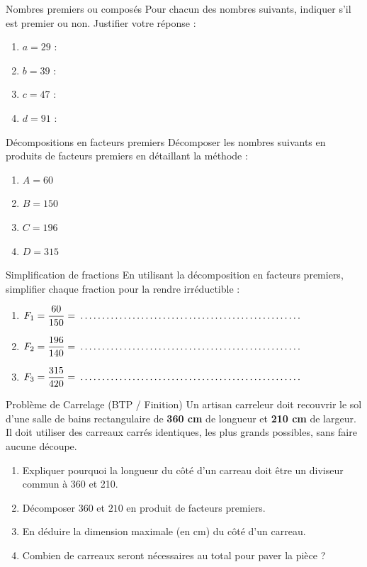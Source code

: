 \begin{exercice}[3 pts]{\capAnalyser}{Nombres premiers ou composés}
Pour chacun des nombres suivants, indiquer s'il est premier ou non. Justifier votre réponse :
\begin{enumerate}
    \item $a = 29$ : \pointille[9cm]
    \item $b = 39$ : \pointille[9cm]
    \item $c = 47$ : \pointille[9cm]
    \item $d = 91$ : \pointille[9cm]
\end{enumerate}
\end{exercice}

\begin{exercice}[3 pts]{\capRealiser}{Décompositions en facteurs premiers}
Décomposer les nombres suivants en produits de facteurs premiers en détaillant la méthode :
\begin{enumerate}
    \item $A = 60$
    \item $B = 150$
    \item $C = 196$
    \item $D = 315$
\end{enumerate}
\lignesreponse[6]
\end{exercice}

\begin{exercice}[4 pts]{\capRealiser}{Simplification de fractions}
En utilisant la décomposition en facteurs premiers, simplifier chaque fraction pour la rendre irréductible :
\begin{enumerate}
    \item $F_1 = \dfrac{60}{150} = \pointille[8cm]$
    \item $F_2 = \dfrac{196}{140} = \pointille[8cm]$
    \item $F_3 = \dfrac{315}{420} = \pointille[8cm]$
\end{enumerate}
\lignesreponse[4]
\end{exercice}

\begin{exercice}[4 pts]{\capAnalyser}{Problème de Carrelage (BTP / Finition)}
Un artisan carreleur doit recouvrir le sol d'une salle de bains rectangulaire de \textbf{360 cm} de longueur et \textbf{210 cm} de largeur.\\
Il doit utiliser des carreaux carrés identiques, les plus grands possibles, sans faire aucune découpe.

\begin{enumerate}
    \item Expliquer pourquoi la longueur du côté d'un carreau doit être un diviseur commun à 360 et 210.
    \item Décomposer $360$ et $210$ en produit de facteurs premiers.
    \item En déduire la dimension maximale (en cm) du côté d'un carreau.
    \item Combien de carreaux seront nécessaires au total pour paver la pièce ?
\end{enumerate}
\lignesreponse[6]
\end{exercice}

